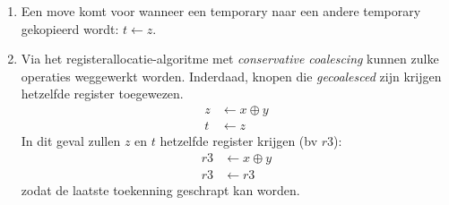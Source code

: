 \documentclass{report}
\begin{document}
{\begin{enumerate}
\begin{enumerate}
				\item Er kan ook \textit{conservative coalescing} toegepast worden. Dit is het samenvoegen van twee move-gerelateerde knopen die het kleuren van de graaf zeker niet moeilijker zal maken. Het algoritme bevat nu twee extra stappen, alle andere stappen zijn hetzelfde als zonder \textit{conservative coalescing}:
				\begin{enumerate}
					\item \textbf{Build}
					\item \textbf{Simplify}
					\item \textbf{Coalesce:} Knopen die samen move-gerelateerd zijn kunnen samengevoegd worden. Er kunnen hier twee heuristieken gebruikt worden om knopen $a$ en $b$ samen te voegen:
					\begin{itemize}
						\item heuristiek van Briggs: als de resulterende knoop $ab$ minder dan $K$ buren heeft met $K$ of meer buren.
						\item heuristiek van George: als elke buur $t$ van $a$ ofwel een buur is van $b$ ofwel een knoop is met minder dan $K$ buren. 
					\end{itemize}
					\item \textbf{Freeze:} Wanneer zowel \textbf{simplify} als \textbf{coalesce} niet meer van toepassing zijn, kunnen de move-gerelateerde knopen bevrozen worden. Dit komt er op neer dat de move-interferentie tussen elke andere knoop die buur is verwijdert wordt, zodat de graaf vereenvoudig is.
					\item \textbf{Spill}
					\item \textbf{Select}
					\item \textbf{Start Over}
				\end{enumerate}
			\end{enumerate}
			\item Een move komt voor wanneer een temporary naar een andere temporary gekopieerd wordt: $t \leftarrow z$. 
			\item Via het registerallocatie-algoritme met \textit{conservative coalescing} kunnen zulke operaties weggewerkt worden. Inderdaad, knopen die \textit{gecoalesced} zijn krijgen hetzelfde register toegewezen. 
			\begin{align*}
				z &\leftarrow x \oplus y \\
				t &\leftarrow z 
			\end{align*}
			In dit geval zullen $z$ en $t$ hetzelfde register krijgen (bv $r3$):
			\begin{align*}
				r3 &\leftarrow x \oplus y \\
				r3 &\leftarrow r3 
			\end{align*}
			zodat de laatste toekenning geschrapt kan worden.


\end{enumerate}}
\end{document}
